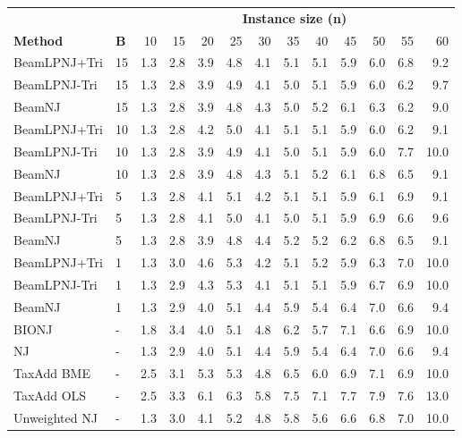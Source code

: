 \begin{tabular}{llrrrrrrrrrrr}
\toprule
&& \multicolumn{11}{c}{\textbf{Instance size (n)}} \\
\cmidrule(lr){3-13}
\textbf{Method} & \textbf{B} & 10 & 15 & 20 & 25 & 30 & 35 & 40 & 45 & 50 & 55 & 60 \\
\midrule
BeamLPNJ+Tri & 15 & 1.3 & 2.8 & 3.9 & 4.8 & 4.1 & 5.1 & 5.1 & 5.9 & 6.0 & 6.8 & 9.2 \\
BeamLPNJ-Tri & 15 & 1.3 & 2.8 & 3.9 & 4.9 & 4.1 & 5.0 & 5.1 & 5.9 & 6.0 & 6.2 & 9.7 \\
BeamNJ & 15 & 1.3 & 2.8 & 3.9 & 4.8 & 4.3 & 5.0 & 5.2 & 6.1 & 6.3 & 6.2 & 9.0 \\
BeamLPNJ+Tri & 10 & 1.3 & 2.8 & 4.2 & 5.0 & 4.1 & 5.1 & 5.1 & 5.9 & 6.0 & 6.2 & 9.1 \\
BeamLPNJ-Tri & 10 & 1.3 & 2.8 & 3.9 & 4.9 & 4.1 & 5.0 & 5.1 & 5.9 & 6.0 & 7.7 & 10.0 \\
BeamNJ & 10 & 1.3 & 2.8 & 3.9 & 4.8 & 4.3 & 5.1 & 5.2 & 6.1 & 6.8 & 6.5 & 9.1 \\
BeamLPNJ+Tri & 5 & 1.3 & 2.8 & 4.1 & 5.1 & 4.2 & 5.1 & 5.1 & 5.9 & 6.1 & 6.9 & 9.1 \\
BeamLPNJ-Tri & 5 & 1.3 & 2.8 & 4.1 & 5.0 & 4.1 & 5.0 & 5.1 & 5.9 & 6.9 & 6.6 & 9.6 \\
BeamNJ & 5 & 1.3 & 2.8 & 3.9 & 4.8 & 4.4 & 5.2 & 5.2 & 6.2 & 6.8 & 6.5 & 9.1 \\
BeamLPNJ+Tri & 1 & 1.3 & 3.0 & 4.6 & 5.3 & 4.2 & 5.1 & 5.2 & 5.9 & 6.3 & 7.0 & 10.0 \\
BeamLPNJ-Tri & 1 & 1.3 & 2.9 & 4.3 & 5.3 & 4.1 & 5.1 & 5.1 & 5.9 & 6.7 & 6.9 & 10.0 \\
BeamNJ & 1 & 1.3 & 2.9 & 4.0 & 5.1 & 4.4 & 5.9 & 5.4 & 6.4 & 7.0 & 6.6 & 9.4 \\
BIONJ & - & 1.8 & 3.4 & 4.0 & 5.1 & 4.8 & 6.2 & 5.7 & 7.1 & 6.6 & 6.9 & 10.0 \\
NJ & - & 1.3 & 2.9 & 4.0 & 5.1 & 4.4 & 5.9 & 5.4 & 6.4 & 7.0 & 6.6 & 9.4 \\
TaxAdd BME & - & 2.5 & 3.1 & 5.3 & 5.3 & 4.8 & 6.5 & 6.0 & 6.9 & 7.1 & 6.9 & 10.0 \\
TaxAdd OLS & - & 2.5 & 3.3 & 6.1 & 6.3 & 5.8 & 7.5 & 7.1 & 7.7 & 7.9 & 7.6 & 13.0 \\
Unweighted NJ & - & 1.3 & 3.0 & 4.1 & 5.2 & 4.8 & 5.8 & 5.6 & 6.6 & 6.8 & 7.0 & 10.0 \\
\bottomrule
\end{tabular}
